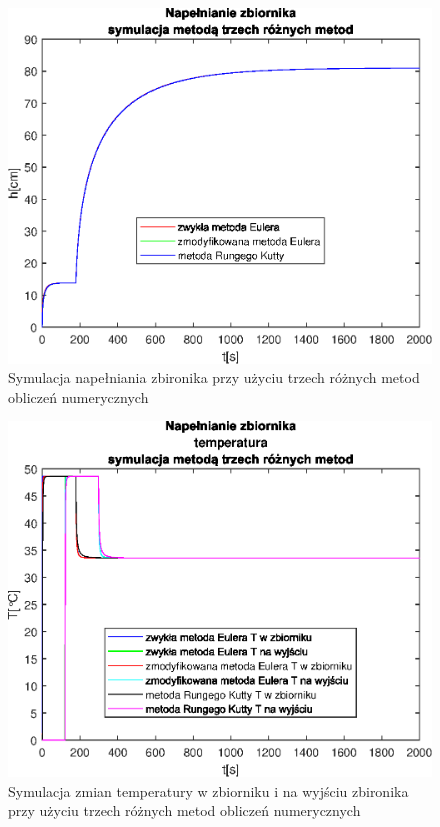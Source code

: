 \begin{figure}[tb]
   \centering
   \includegraphics{img/object-simulation/method-comparison-volume.eps}
   \caption{Symulacja napełniania zbironika przy użyciu trzech różnych metod obliczeń numerycznych}
   \label{fig:method-comparison-volume}
\end{figure}
            
\begin{figure}[tb]
   \centering
   \includegraphics{img/object-simulation/method-comparison-temperature.eps}
   \caption{Symulacja zmian temperatury w zbiorniku i na wyjściu zbironika przy użyciu trzech różnych metod obliczeń numerycznych}
   \label{fig:method-comparison-volume}
\end{figure}
            
